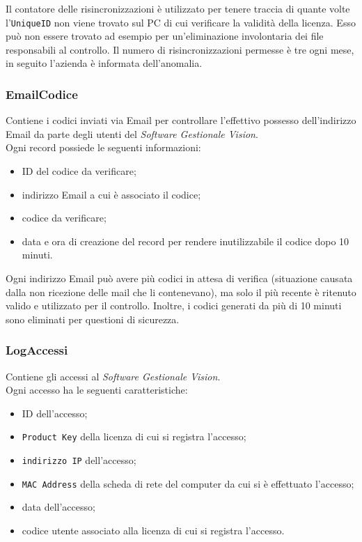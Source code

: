 Il contatore delle risincronizzazioni è utilizzato per tenere traccia di quante volte l'\texttt{UniqueID} non viene trovato sul PC di cui verificare la validità della licenza. Esso può non essere trovato ad esempio per un'eliminazione involontaria dei file responsabili al controllo. Il numero di risincronizzazioni permesse è tre ogni mese, in seguito l'azienda è informata dell'anomalia.


\subsubsection{EmailCodice}

Contiene i codici inviati via Email per controllare l’effettivo possesso dell’indirizzo Email da parte degli utenti del \textit{Software Gestionale Vision}.
\\Ogni record possiede le seguenti informazioni:

\begin{itemize}
\item ID del codice da verificare;
\item indirizzo Email a cui è associato il codice;
\item codice da verificare;
\item data e ora di creazione del record per rendere inutilizzabile il codice dopo 10 minuti.
\end{itemize}

Ogni indirizzo Email può avere più codici in attesa di verifica (situazione causata dalla non ricezione delle mail che li contenevano), ma solo il più recente è ritenuto valido e utilizzato per il controllo. Inoltre, i codici generati da più di 10 minuti sono eliminati per questioni di sicurezza.

\subsubsection{LogAccessi}

Contiene gli accessi al \textit{Software Gestionale Vision}.
\\Ogni accesso ha le seguenti caratteristiche:

\begin{itemize}
\item ID dell'accesso;
\item \texttt{Product Key} della licenza di cui si registra l'accesso;
\item \texttt{indirizzo IP} dell'accesso;
\item \texttt{MAC Address} della scheda di rete del computer da cui si è effettuato l'accesso;
\item data dell'accesso;
\item codice utente associato alla licenza di cui si registra l'accesso.
\end{itemize}


